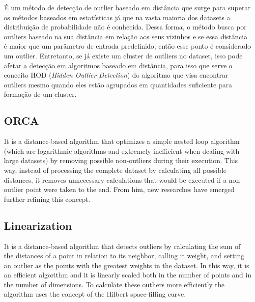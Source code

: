 
É um método de detecção de outlier baseado em distância \cite{Xu2016} que surge para superar os métodos baseados em estatísticas já que na vasta maioria dos datasets a distribuição de probabilidade não é conhecida. Dessa forma, o método busca por outliers baseado na sua distância em relação aos seus vizinhos e se essa distância é maior que um parâmetro de entrada predefinido, então esse ponto é considerado um outlier. Entretanto, se já existe um cluster de outliers no dataset, isso pode afetar a detecção em algoritmos baseado em distância, para isso que serve o conceito HOD (\textit{Hidden Outlier Detection}) do algoritmo que visa encontrar outliers mesmo quando eles estão agrupados em quantidades suficiente para formação de um cluster.

\subsection{ORCA}

It is a distance-based algorithm \cite{Bay:2003:MDO:956750.956758} that optimizes a simple nested loop algorithm (which are logarithmic algorithms and extremely inefficient when dealing with large datasets) by removing possible non-outliers during their execution. This way, instead of processing the complete dataset by calculating all possible distances, it removes unnecessary calculations that would be executed if a non-outlier point were taken to the end. From him, new researches have emerged further refining this concept.

\subsection{Linearization}

It is a distance-based algorithm \cite{10.1007/3-540-45681-3_2} that detects outliers by calculating the sum of the distances
of a point in relation to its neighbor, calling it weight, and setting an outlier as the points
with the greatest weights in the dataset. In this way, it is an efficient algorithm and it is
linearly scaled both in the number of points and in the number of dimensions. To calculate these
outliers more efficiently the algorithm uses the concept of the Hilbert space-filling curve.

